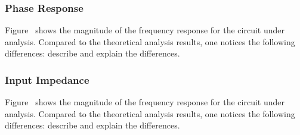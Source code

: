 \subsubsection{Phase Response}

Figure~ shows the magnitude of the frequency response for the
circuit under analysis. Compared to the theoretical analysis results, one
notices the following differences: describe and explain the differences.


\subsubsection{Input Impedance}

Figure~ shows the magnitude of the frequency response for the
circuit under analysis. Compared to the theoretical analysis results, one
notices the following differences: describe and explain the differences.





